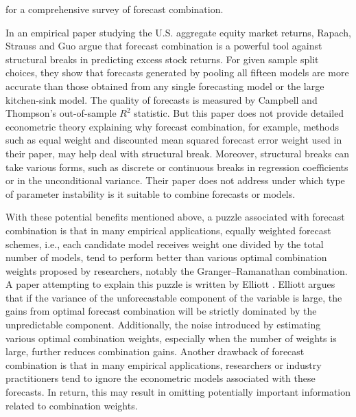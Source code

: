 \cite{timmermann2006forecast} for a comprehensive survey of forecast combination.

In an empirical paper studying the U.S. aggregate equity market returns, Rapach, Strauss and Guo \cite{rsz2010} argue that forecast combination is a powerful tool against structural breaks in predicting excess stock returns. For given sample split choices, they show that forecasts generated by pooling all fifteen models are more accurate than those obtained from any single forecasting model or the large kitchen-sink model. The quality of forecasts is measured by Campbell and Thompson's \cite{campbell_thompson_RFS2008} out-of-sample $R^{2}$ statistic. But this paper does not provide detailed econometric theory explaining why forecast combination, for example, methods such as equal weight and discounted mean squared forecast error weight used in their paper, may help deal with structural break. Moreover, structural breaks can take various forms, such as discrete or continuous breaks in regression coefficients or in the unconditional variance. Their paper does not address under which type of parameter instability is it suitable to combine forecasts or models.

With these potential benefits mentioned above, a puzzle associated with forecast combination is that in many empirical applications, equally weighted forecast schemes, i.e., each candidate model receives weight one divided by the total number of models, tend to perform better than various optimal combination weights proposed by researchers, notably the Granger--Ramanathan combination. A paper attempting to explain this puzzle is written by Elliott \cite{elliott11}. Elliott argues that if the variance of the unforecastable component of the variable is large, the gains from optimal forecast combination will be strictly dominated by the unpredictable component. Additionally, the noise introduced by estimating various optimal combination weights, especially when the number of weights is large, further reduces combination gains. Another drawback of forecast combination is that in many empirical applications, researchers or industry practitioners tend to ignore the econometric models associated with these forecasts. In return, this may result in omitting potentially important information related to combination weights.

